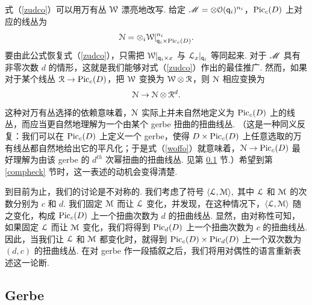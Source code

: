 式（\ref{zudco}）可以用万有丛 ${\mathcal W}$ 漂亮地改写. 给定 ${\mathscr{M}}=\otimes {\mathcal O}({\sf q}_i)^{n_i}$，${\mathrm{Pic}}_c(D)$ 上对应的线丛为
\begin{equation}\label{offo} {\cal N}=\otimes_i {\mathcal W}|^{n_i}_{{\sf q}_i\times {\mathrm{Pic}}_c(D)}. \end{equation}
要由此公式恢复式（\ref{zudco}），只需把 ${\mathcal W}|_{{\sf q}_i\times x}$ 与 ${\mathcal L}_x|_{{\sf q}_i}$ 等同起来. 对于 ${\mathscr{M}}$ 具有非零次数 $d$ 的情形，这就是我们能够对式（\ref{zudco}）作出的最佳推广. 然而，如果对于某个线丛 $\mathcal{R}\to {\mathrm{Pic}}_c(D)$，把 ${\mathcal W}$ 变换为 ${\mathcal W}\otimes \mathcal{R}$，则 ${\cal N}$ 相应变换为
\begin{equation}\label{woffo}{\cal N}\to {\cal N}\otimes \mathcal{R}^d. \end{equation}
这种对万有丛选择的依赖意味着，${\cal N}$ 实际上并未自然地定义为 ${\mathrm{Pic}}_c(D)$ 上的线丛，而应当更自然地理解为一个由某个 gerbe 扭曲的扭曲线丛. （这是一种同义反复：我们可以在 ${\mathrm{Pic}}_c(D)$ 上定义一个 gerbe，使得 $D\times {\mathrm{Pic}}_c(D)$ 上任意选取的万有线丛都自然地给出它的平凡化；于是式（\ref{woffo}）就意味着，${\cal N}\to {\mathrm{Pic}}_c(D)$ 最好理解为由该 gerbe 的 $d^{th}$ 次幂扭曲的扭曲线丛. 见第 \ref{gerbes} 节.）希望到第 \ref{compheck} 节时，这一表述的动机会变得清楚.





到目前为止，我们的讨论是不对称的. 我们考虑了符号 $\langle{\cal L},{\cal M}\rangle,$ 其中 ${\cal L}$ 和 ${\cal M}$ 的次数分别为 $c$ 和 $d$. 我们固定 ${\cal M}$ 而让 ${\cal L}$ 变化，并发现，在这种情况下，$\langle{\cal L},{\cal M}\rangle$ 随之变化，构成 ${\rm Pic}_c(D)$ 上一个扭曲次数为 $d$ 的扭曲线丛. 显然，由对称性可知，如果固定 ${\cal L}$ 而让 ${\cal M}$ 变化，我们将得到 ${\rm Pic}_d(D)$ 上一个扭曲次数为 $c$ 的扭曲线丛. 因此，当我们让 ${\cal L}$ 和 ${\cal M}$ 都变化时，就得到 ${\rm Pic}_c(D)\times {\rm Pic}_d(D)$ 上一个双次数为 $(d,c)$ 的扭曲线丛. 在对 gerbe 作一段插叙之后，我们将用对偶性的语言重新表述这一论断.

\subsection{Gerbe}\label{gerbes}

